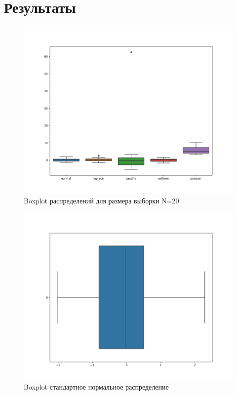 \documentclass[a4]{article}
\begin{document}
\section{Результаты}
\begin{center}

\begin{figure}[H]
\caption{Boxplot распределений для размера выборки N=20 }
\includegraphics[width=\textwidth]{boxplot_N=20.png}
\end{figure}

\begin{figure}[H]
	\caption{Boxplot стандартное нормальное распределение }
	\includegraphics[width=\textwidth]{boxplot_N=100_normal.png} 
\end{figure}


\end{center}
\end{document}
